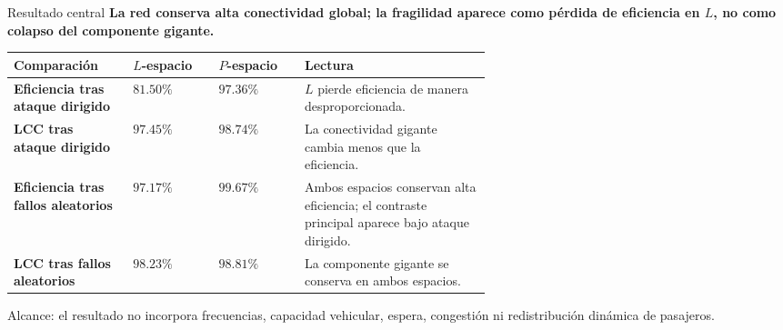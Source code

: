 \documentclass[aspectratio=169,10pt]{beamer}
\newcommand{\thinrule}{\par\vspace{0.2cm}\noindent{\color{linegray}\rule{0.88\linewidth}{0.45pt}}\par\vspace{0.2cm}}
\newcommand{\claim}[1]{%
  \vspace{0.2cm}
  {\large\bfseries #1}
}
\begin{document}
\begin{frame}{Resultado central}
  \claim{La red conserva alta conectividad global; la fragilidad aparece como p\'erdida de eficiencia en \(L\), no como colapso del componente gigante.}

  \vspace{0.25cm}
  \scriptsize
  \begin{tabularx}{\linewidth}{@{}>{\bfseries}p{0.25\linewidth}p{0.18\linewidth}p{0.18\linewidth}X@{}}
    \toprule
    Comparación & \(L\)-espacio & \(P\)-espacio & Lectura \\
    \midrule
    Eficiencia tras ataque dirigido & \(81.50\%\) & \(97.36\%\) & \(L\) pierde eficiencia de manera desproporcionada. \\
    LCC tras ataque dirigido & \(97.45\%\) & \(98.74\%\) & La conectividad gigante cambia menos que la eficiencia. \\
    Eficiencia tras fallos aleatorios & \(97.17\%\) & \(99.67\%\) & Ambos espacios conservan alta eficiencia; el contraste principal aparece bajo ataque dirigido. \\
    LCC tras fallos aleatorios & \(98.23\%\) & \(98.81\%\) & La componente gigante se conserva en ambos espacios. \\
    \bottomrule
  \end{tabularx}

  \normalsize
  \thinrule
  Alcance: el resultado no incorpora frecuencias, capacidad vehicular, espera, congestión ni redistribución dinámica de pasajeros.
\end{frame}
\end{document}
